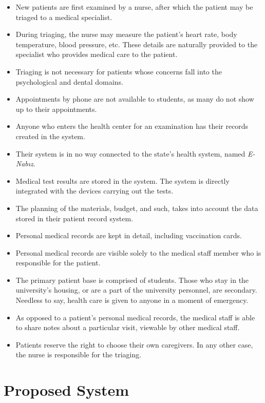 \documentclass[a4paper, 12pt, titlepage]{article}
\begin{document}
  \begin{itemize}
    \item New patients are first examined by a nurse, after which the patient may be triaged to a medical specialist.
    \item During triaging, the nurse may measure the patient's heart rate, body temperature, blood pressure, etc.
      These details are naturally provided to the specialist who provides medical care to the patient.
    \item Triaging is not necessary for patients whose concerns fall into the psychological and dental domains.
    \item Appointments by phone are not available to students, as many do not show up to their appointments.
    \item Anyone who enters the health center for an examination has their records created in the system.
    \item Their system is in no way connected to the state's health system, named \textit{E-Nabız}.
    \item Medical test results are stored in the system. The system is directly integrated with the devices carrying out the tests.
    \item The planning of the materials, budget, and such, takes into account the data stored in their patient record system.
    \item Personal medical records are kept in detail, including vaccination cards.
    \item Personal medical records are visible solely to the medical staff member who is responsible for the patient.
    \item The primary patient base is comprised of students.
      Those who stay in the university's housing, or are a part of the university personnel, are secondary.
      Needless to say, health care is given to anyone in a moment of emergency.
    \item As opposed to a patient's personal medical records,
      the medical staff is able to share notes about a particular visit,
      viewable by other medical staff.
    \item Patients reserve the right to choose their own caregivers.
      In any other case, the nurse is responsible for the triaging.
  \end{itemize}

  \section{Proposed System}
\end{document}
